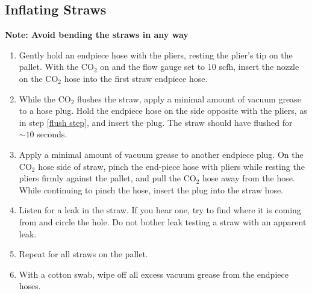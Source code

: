 \documentclass[letterpaper,12pt]{article}
\begin{document}
\subsection{Inflating Straws} \label{performing test}
{\bf Note: Avoid bending the straws in any way}
	\begin{enumerate}
		\item Gently hold an endpiece hose with the pliers, resting the plier's tip on the pallet. With the CO$_2$ on and the flow gauge set to 10 scfh, insert the nozzle on the CO$_2$ hose into the first straw endpiece hose. \label{flush step}
		\item While the CO$_2$ flushes the straw, apply a minimal amount of vacuum grease to a hose plug. Hold the endpiece hose on the side opposite with the pliers, as in step \ref{flush step}, and insert the plug. The straw should have flushed for $\sim 10$ seconds.
		\item Apply a minimal amount of vacuum grease to another endpiece plug. On the CO$_2$ hose side of straw, pinch the end-piece hose with pliers while resting the pliers firmly against the pallet, and pull the CO$_2$ hose away from the hose. While continuing to pinch the hose, insert the plug into the straw hose.
		\item Listen for a leak in the straw. If you hear one, try to find where it is coming from and circle the hole. Do not bother leak testing a straw with an apparent leak.
		\item Repeat for all straws on the pallet.
		\item With a cotton swab, wipe off all excess vacuum grease from the endpiece hoses.


\end{enumerate}
\end{document}
